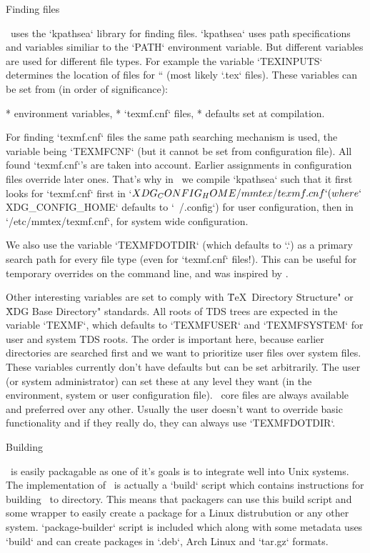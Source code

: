 \sec Finding files

\LuaTeX\ uses the `kpathsea` library for finding files. `kpathsea` uses path
specifications and variables similiar to the `PATH` environment variable. But
different variables are used for different file types. For example the variable
`TEXINPUTS` determines the location of files for `` (most likely `.tex`
files). These variables can be set from (in order of significance):

\begitems
* environment variables,
* `texmf.cnf` files,
* defaults set at compilation.
\enditems

For finding `texmf.cnf` files the same path searching mechanism is used, the
variable being `TEXMFCNF` (but it cannot be set from configuration file). All
found `texmf.cnf`'s are taken into account. Earlier assignments in
configuration files override later ones. That's why in \MMTeX\ we compile
`kpathsea` such that it first looks for `texmf.cnf` first in
`$XDG_CONFIG_HOME/mmtex/texmf.cnf` (where `$XDG_CONFIG_HOME` defaults to
`~/.config`) for user configuration, then in `/etc/mmtex/texmf.cnf`, for system
wide configuration.

We also use the variable `TEXMFDOTDIR` (which defaults to `.`) as a primary
search path for every file type (even for `texmf.cnf` files!). This can be
useful for temporary overrides on the command line, and was inspired by
\TeXLive.

Other interesting variables are set to comply with \"\TeX\ Directory Structure"
or \"XDG Base Directory" standards. All roots of TDS trees are expected in the
variable `TEXMF`, which defaults to `TEXMFUSER` and `TEXMFSYSTEM` for user and
system TDS roots. The order is important here, because earlier directories are
searched first and we want to prioritize user files over system files. These
variables currently don't have defaults but can be set arbitrarily. The user
(or system administrator) can set these at any level they want (in the
environment, system or user configuration file). \MMTeX\ core files are always
available and preferred over any other. Usually the user doesn't want to
override basic functionality and if they really do, they can always use
`TEXMFDOTDIR`.

\sec Building \MMTeX

\MMTeX\ is easily packagable as one of it's goals is to integrate well into
Unix systems. The implementation of \MMTeX\ is actually a `build` script which
contains instructions for building \MMTeX\ to directory. This means that
packagers can use this build script and some wrapper to easily create a package
for a Linux distrubution or any other system. `package-builder` script is
included which along with some metadata uses `build` and can create packages in
`.deb`, Arch Linux and `tar.gz` formats.

